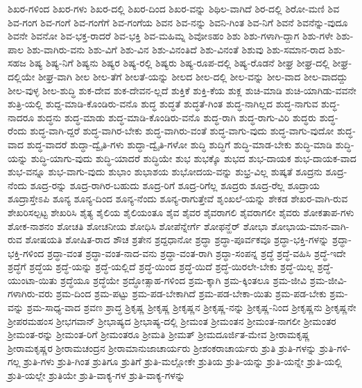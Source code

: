 {ಶಿಖರ-ಗಳಿಂದ
ಶಿಖರ-ಗಳು
ಶಿಖರ-ದಲ್ಲಿ
ಶಿಖರ-ದಿಂದ
ಶಿಖರ-ವನ್ನು
ಶಿಥಿಲ-ವಾಗಿದೆ
ಶಿರ-ದಲ್ಲಿ
ಶಿರೋ-ಮಣಿ
ಶಿವ
ಶಿವ-ಗಂಗ
ಶಿವ-ಗಂಗೆ
ಶಿವ-ಗಂಗೆಗೆ
ಶಿವ-ಗಂಗೆಯ
ಶಿವನ
ಶಿವ-ನನ್ನು
ಶಿವನಿ-ಗಿಂತ
ಶಿವ-ನಿಗೆ
ಶಿವನೆ
ಶಿವನೆನ್ನು-ವುದೂ
ಶಿವನೇ
ಶಿವನೋ
ಶಿವ-ಭಕ್ತ-ರಾದರೆ
ಶಿವ-ಭಕ್ತಿ
ಶಿವ-ಮಹಿಮ್ನ
ಶಿವೋಽಹಂ
ಶಿಶು
ಶಿಶು-ಗಳಾಗಿ-ದ್ದಾಗ
ಶಿಶು-ಗಳೇ
ಶಿಶು-ಪಾಲ
ಶಿಶು-ವಾಗಿರು-ವನು
ಶಿಶು-ವಿಗೆ
ಶಿಶು-ವಿನ
ಶಿಶು-ವಿನಂತಿದೆ
ಶಿಶು-ವಿನಂತೆ
ಶಿಶುವು
ಶಿಶು-ಸಮಾನ-ರಾದ
ಶಿಶು-ಸಹಜ
ಶಿಷ್ಯ
ಶಿಷ್ಯ-ನಿಗೆ
ಶಿಷ್ಯನು
ಶಿಷ್ಯರ
ಶಿಷ್ಯ-ರಲ್ಲಿ
ಶಿಷ್ಯರು
ಶಿಷ್ಯ-ರೂಪ-ದಲ್ಲಿ
ಶಿಷ್ಯ-ರೊಡನೆ
ಶೀಘ್ರ
ಶೀಘ್ರ-ದಲ್ಲಿ
ಶೀಘ್ರ-ದಲ್ಲಿಯೇ
ಶೀಘ್ರ-ವಾಗಿ
ಶೀಲ
ಶೀಲ-ತೆಗೆ
ಶೀಲತೆ-ಯನ್ನು
ಶೀಲದ
ಶೀಲ-ದಲ್ಲಿ
ಶೀಲ-ವನ್ನು
ಶೀಲ-ವಾದ
ಶೀಲ-ವಾದದ್ದು
ಶೀಲ-ವುಳ್ಳ
ಶೀಲ-ಶುದ್ಧಿ
ಶುಕ-ದೇವ
ಶುಕ-ದೇವನ-ಲ್ಲದೆ
ಶುಕ್ತಿಕೆ
ಶುಕ್ತಿ-ಕೆಯ
ಶುಕ್ಲ
ಶುಚಿ-ಮಾಡಿ
ಶುಚಿ-ಯಾಗಿಡು-ವವನೇ
ಶುತ್ರಿ-ಯಲ್ಲಿ
ಶುದ್ದ-ಮಾಡಿ-ಕೊಂಡಿರು-ವನೊ
ಶುದ್ಧ
ಶುದ್ಧತೆ
ಶುದ್ಧತೆ-ಗಿಂತ
ಶುದ್ಧ-ನಾಗಿಲ್ಲದ
ಶುದ್ಧ-ನಾಗುವ
ಶುದ್ಧ-ನಾದರೂ
ಶುದ್ಧನು
ಶುದ್ಧ-ಮಾಡು
ಶುದ್ಧ-ಮಾಡಿ-ಕೊಂಡಿರು-ವನೊ
ಶುದ್ಧ-ರಾಗಿ
ಶುದ್ಧ-ರಾಗು-ವಿರಿ
ಶುದ್ಧರು
ಶುದ್ಧ-ರೆಂದು
ಶುದ್ಧ-ವಾಗಿ-ದ್ದರೆ
ಶುದ್ಧ-ವಾಗಿರ-ಬೇಕು
ಶುದ್ಧ-ವಾಗಿರು-ವಂತೆ
ಶುದ್ಧ-ವಾಗು-ವುದು
ಶುದ್ಧ-ವಾಗು-ವುದೋ
ಶುದ್ಧ-ವಾದ
ಶುದ್ಧ-ವಾದರೆ
ಶುದ್ಧಾ-ದ್ವೈತಿ-ಗಳು
ಶುದ್ಧಾ-ದ್ವೈತಿ-ಗಳೋ
ಶುದ್ಧಿ
ಶುದ್ಧಿಗೆ
ಶುದ್ಧಿ-ಮಾಡ-ಬೇಕು
ಶುದ್ಧಿ-ಮಾಡಿ
ಶುದ್ಧಿ-ಯನ್ನು
ಶುದ್ಧಿ-ಯಾಗು-ವುದು
ಶುದ್ಧಿ-ಯಾದರೆ
ಶುದ್ಧಿಯೇ
ಶುಭ
ಶುಭಕ್ಕೊ
ಶುಭದ
ಶುಭ-ದಾಯಕ
ಶುಭ-ದಾಯಕ-ವಾದ
ಶುಭ-ವನ್ನೂ
ಶುಭ-ವಾಗು-ವುದು
ಶುಭಾಂ
ಶುಭಾಶಯ
ಶುಭೋದಯ-ವನ್ನು
ಶುಭ್ರ-ವಿಲ್ಲ
ಶುಷ್ಕತೆ
ಶೂದ್ರನು
ಶೂದ್ರ-ನೆಂದು
ಶೂದ್ರ-ರನ್ನು
ಶೂದ್ರ-ರಾಗಿರ-ಬಹುದು
ಶೂದ್ರ-ರಿಗೆ
ಶೂದ್ರ-ರಿಗೆಲ್ಲ
ಶೂದ್ರರು
ಶೂದ್ರ-ರೆಲ್ಲ
ಶೂದ್ರಾಯ
ಶೂದ್ರಾಸ್ತೇಽಪಿ
ಶೂನ್ಯ
ಶೂನ್ಯ-ದಿಂದ
ಶೂನ್ಯ-ನೆಂದು
ಶೂನ್ಯ-ರಾಗುತ್ತೇವೆ
ಶೃಂಖಲೆ-ಯನ್ನು
ಶೇಕಡ
ಶೇಖರ-ವಾಗಿ-ರುವ
ಶೇಖರಿಸಲ್ಪಟ್ಟ
ಶೇಖರಿಸಿ
ಶೈತ್ಯ
ಶೈಲಿಯ
ಶೈಲಿಯಂತೂ
ಶೈವ
ಶೈವರ
ಶೈವರಾಗಲಿ
ಶೈವರಾಗಲೀ
ಶೈವರು
ಶೋಕತಾಪ-ಗಳು
ಶೋಕ-ನಾಶನಂ
ಶೋಚತಿ
ಶೋಚನೀಯ
ಶೋಧಿಸಿ
ಶೋಪೆನ್ನೇರ್ಗೆ
ಶೋಫನ್ಹೆರ್
ಶೋಭಾ
ಶೋಭಾಯ-ಮಾನ-ವಾಗಿ-ರುವ
ಶೋಷಯತಿ
ಶೋಷಿತ-ರಾದ
ಶೌಚ
ಶ್ರತೇನ
ಶ್ರದ್ದಧಾನೋ
ಶ್ರದ್ಧಾ
ಶ್ರದ್ಧಾ-ಪೂರ್ವಕವೂ
ಶ್ರದ್ಧಾ-ಭಕ್ತಿ-ಗಳನ್ನು
ಶ್ರದ್ಧಾ-ಭಕ್ತಿ-ಗಳಿಂದ
ಶ್ರದ್ಧಾ-ವಂತ
ಶ್ರದ್ಧಾ-ವಂತ-ನಾದ-ವನು
ಶ್ರದ್ಧಾ-ವಂತ-ರಾಗಿ
ಶ್ರದ್ಧಾ-ಸಂಪನ್ನ
ಶ್ರದ್ಧೆ
ಶ್ರದ್ಧೆ-ವಹಿಸಿ
ಶ್ರದ್ಧೆ-ಇದೇ
ಶ್ರದ್ಧೆಗೆ
ಶ್ರದ್ಧೆಯ
ಶ್ರದ್ಧೆ-ಯನ್ನು
ಶ್ರದ್ಧೆ-ಯಲ್ಲಿದೆ
ಶ್ರದ್ಧೆ-ಯಿಂದ
ಶ್ರದ್ಧೆ-ಯಿದೆ
ಶ್ರದ್ಧೆ-ಯಿರಲೇ-ಬೇಕು
ಶ್ರದ್ಧೆ-ಯಿಲ್ಲ
ಶ್ರದ್ಧೆ-ಯುಂಟಾ-ಯಿತು
ಶ್ರದ್ಧೆಯೂ
ಶ್ರದ್ಧೆಯೇ
ಶ್ರದ್ಧೋತ್ಸಾಹ-ಗಳಿಂದ
ಶ್ರಮ-ಕ್ಕಾಗಿ
ಶ್ರಮ-ಕ್ಕಿಂತಲೂ
ಶ್ರಮ-ಜೀವಿ
ಶ್ರಮ-ಜೀವಿ-ಗಳಾಗಿರು-ವರು
ಶ್ರಮ-ದಿಂದ
ಶ್ರಮ-ಪಟ್ಟು
ಶ್ರಮ-ಪಡ-ಬೇಕಾಗಿದೆ
ಶ್ರಮ-ಪಡ-ಬೇಕಾ-ಯಿತು
ಶ್ರಮ-ಪಡ-ಬೇಕು
ಶ್ರಮ-ವನ್ನು
ಶ್ರಮ-ಸಾಧ್ಯ-ವಾದ
ಶ್ರವಣ
ಶ್ರಾದ್ಧ
ಶ್ರಿಕೃಷ್ಣ
ಶ್ರೀಕೃಷ್ಣ
ಶ್ರೀಕೃಷ್ಣನ
ಶ್ರೀಕೃಷ್ಣ-ನನ್ನು
ಶ್ರೀಕೃಷ್ಣ-ನಿಂದ
ಶ್ರೀಕೃಷ್ಣನು
ಶ್ರೀಕೃಷ್ಣನೇ
ಶ್ರೀಪರಮಹಂಸ
ಶ್ರೀಭಗವಾನ್
ಶ್ರೀಭಾಷ್ಯದ
ಶ್ರೀಭಾಷ್ಯ-ದಲ್ಲಿ
ಶ್ರೀಮಂತ
ಶ್ರೀಮಂತನ
ಶ್ರೀಮಂತ-ನಾಗಲೀ
ಶ್ರೀಮಂತರ
ಶ್ರೀಮಂತ-ರನ್ನು
ಶ್ರೀಮಂತ-ರಿಗೆ
ಶ್ರೀಮಂತರೂ
ಶ್ರೀಮತಿ
ಶ್ರೀಮತ್
ಶ್ರೀಮದೂರ್ಜಿತ-ಮೇವ
ಶ್ರೀರಾಮಕೃಷ್ಣ
ಶ್ರೀರಾಮಕೃಷ್ಣರ
ಶ್ರೀರಾಮಚಂದ್ರನ
ಶ್ರೀರಾಮಾನುಜಾಚಾರ್ಯರು
ಶ್ರೀಶಂಕರಾಚಾರ್ಯರು
ಶ್ರುತಿ
ಶ್ರುತಿ-ಗಳನ್ನು
ಶ್ರುತಿ-ಗಳಿ-ಗಲ್ಲ
ಶ್ರುತಿ-ಗಳು
ಶ್ರುತಿ-ಗಿಂತ
ಶ್ರುತಿಗೂ
ಶ್ರುತಿಗೆ
ಶ್ರುತಿ-ಮಲ್ಲೋಕೇ
ಶ್ರುತಿಯ
ಶ್ರುತಿ-ಯನ್ನು
ಶ್ರುತಿ-ಯನ್ನೇ
ಶ್ರುತಿ-ಯಲ್ಲಿ
ಶ್ರುತಿ-ಯಲ್ಲೇ
ಶ್ರುತಿಯೇ
ಶ್ರುತಿ-ವಾಕ್ಯ-ಗಳ
ಶ್ರುತಿ-ವಾಕ್ಯ-ಗಳನ್ನು
}
